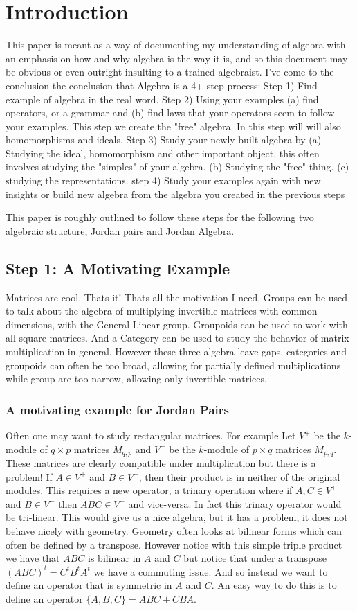 \section{Introduction}
This paper is meant as a way of documenting my understanding of 
algebra with an emphasis on how and why algebra is the way it is, 
and so this document may be obvious or even outright insulting to a trained algebraist.
I've come to the conclusion the conclusion that Algebra is a 4+ step process:
Step 1) Find example of algebra in the real word. 
Step 2) Using your examples (a) find operators, or a grammar and (b) find laws that your operators seem to follow your examples. This step we create the "free" algebra. In this step will will also homomorphisms and ideals.
Step 3) Study your newly built algebra by (a) Studying the ideal, homomorphism and other important object, this often involves studying the "simples" of your algebra. (b) Studying the "free" thing. (c) studying the representations.
step 4) Study your examples again with new insights or build new algebra from the algebra you created in the previous steps


This paper is roughly outlined to follow these steps for the following two algebraic structure, Jordan pairs and Jordan Algebra.
\subsection{Step 1: A Motivating Example}
Matrices are cool. Thats it! Thats all the motivation I need.
Groups can be used to talk about the algebra of multiplying 
invertible matrices with common dimensions, with the General Linear group.
Groupoids can be used to work with all square matrices. And a Category can be 
used to study the behavior of matrix multiplication in general. However these 
three algebra leave gaps, categories and groupoids can often be too broad, allowing
for partially defined multiplications while group are too narrow, allowing only 
invertible matrices.

\subsubsection*{A motivating example for Jordan Pairs}
Often one may want to study rectangular matrices. For example Let $V^+$ be the 
$k$-module of $q\times p$ matrices $M_{q,p}$ and $V^-$ be the 
$k$-module of $p\times q$ matrices $M_{p,q}$. These matrices are clearly compatible under 
multiplication but there is a problem! If $A\in V^+$ and $B\in V^-$, then their product is in neither
of the original modules. This requires a new operator, a trinary operation where if $A,C\in V^+$ and $B\in V^-$
then $ABC\in V^+$ and vice-versa. In fact this trinary operator would be tri-linear.
This would give us a nice algebra, but it has a problem, it does not behave nicely with geometry.
Geometry often looks at bilinear forms which can often be defined by a transpose. 
However notice with this simple triple product we have that $ABC$ is bilinear in $A$ and $C$ but notice that 
under a transpose $(ABC)^t=C^tB^tA^t$ we have a commuting issue. And so instead we want to define an operator
that is symmetric in $A$ and $C$. An easy way to do this is to define an operator $\{A,B,C\}=ABC+CBA$.

